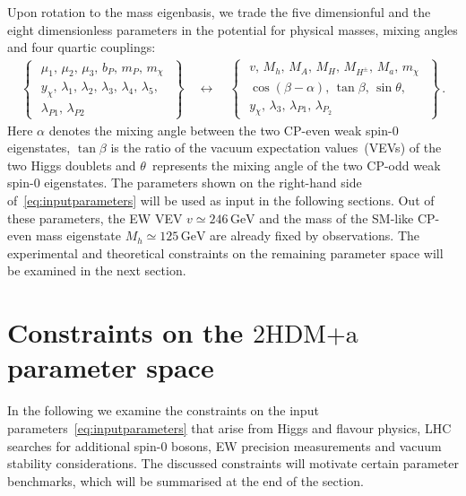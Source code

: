 \documentclass[review]{elsarticle}
\newcommand{\hdma}{\ensuremath{\textrm{2HDM+a}}\xspace}
\begin{document}
Upon rotation to the mass eigenbasis, we trade the five dimensionful and the eight dimensionless parameters in the potential for physical masses, mixing angles and four quartic couplings:
\begin{align} \label{eq:inputparameters}
\left\{ \,\,\begin{matrix}
\mu_1,\,\mu_2,\,\mu_3,\,b_P,\,m_P,\,m_\chi\\[3pt]
y_\chi,\,\lambda_1,\,\lambda_2,\,\lambda_3,\,\lambda_4,\,\lambda_5,\\
\lambda_{P1},\,\lambda_{P2}
\end{matrix}\,\,\right\}\quad  \longleftrightarrow  \quad \left\{ \,\,\begin{matrix}
v,\,M_h,\,M_A,\,M_H,\,M_{H^\pm},\,M_a,\,m_\chi \\[3pt]
\cos(\beta-\alpha),\,\tan \beta,\,\sin  \theta,\\[3pt]
y_\chi,\,\lambda_3,\,\lambda_{P1},\,\lambda_{P_2}
\end{matrix}\,\,\right\}\,.
\end{align}
Here $\alpha$ denotes the mixing angle between the two CP-even weak spin-0 eigenstates, $\tan \beta$ is the ratio of the vacuum expectation values~(VEVs) of the two Higgs doublets and $\theta$~represents the mixing angle of the two CP-odd weak spin-0 eigenstates. The parameters shown on the right-hand side of~\eqref{eq:inputparameters} will be used as input in the following sections. Out of these  parameters, the EW VEV $v \simeq 246 \, {\mathrm{GeV}}$ and the mass of the SM-like CP-even mass eigenstate $M_h \simeq 125 \, {\mathrm{GeV}}$ are already fixed by observations. The experimental and theoretical constraints on the remaining parameter space will be examined in the next section. 


\section{Constraints on the \hdma parameter space}
\label{sec:constraints}

In the following we examine the constraints on the input parameters~\eqref{eq:inputparameters} that arise from Higgs and flavour physics, LHC searches for additional spin-0 bosons, EW precision measurements and vacuum stability considerations. The discussed constraints will motivate certain parameter benchmarks, which will be summarised at the end of the section. 
\end{document}
